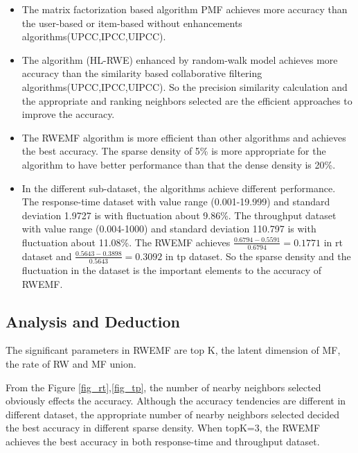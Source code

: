 \documentclass[conference]{IEEEtran}
\begin{document}
\begin{itemize}
\item The matrix factorization based algorithm PMF achieves more accuracy than the user-based or item-based without enhancements algorithms(UPCC,IPCC,UIPCC). 
\item The algorithm (HL-RWE) enhanced by random-walk model achieves more accuracy than the similarity based collaborative filtering algorithms(UPCC,IPCC,UIPCC). So the precision similarity calculation and the appropriate and ranking neighbors selected are the efficient approaches to improve the accuracy.
\item The RWEMF algorithm is more efficient than other algorithms and achieves the best accuracy. The sparse density of 5\% is more appropriate for the algorithm to have better performance than that the dense density is 20\%.
\item In the different sub-dataset, the algorithms achieve different performance. The response-time dataset with value range (0.001-19.999) and standard deviation 1.9727 is with fluctuation about 9.86\%. The throughput dataset with value range (0.004-1000) and standard deviation 110.797 is with fluctuation about 11.08\%. The RWEMF achieves $\frac{0.6794-0.5591}{0.6794}=0.1771$ in rt dataset and $\frac{0.5643-0.3898}{0.5643}=0.3092$ in tp dataset. So the sparse density and the fluctuation in the dataset is the important elements to the accuracy of RWEMF.
\end{itemize}

\subsection{Analysis and Deduction}
\par The significant parameters in RWEMF are top K, the latent dimension of MF, the rate of RW and MF union. 

\par From the Figure \ref{fig_rt},\ref{fig_tp}, the number of nearby neighbors selected obviously effects the accuracy. Although the accuracy tendencies are different in different dataset, the appropriate number of nearby neighbors selected decided the best accuracy in different sparse density. When topK=3, the RWEMF achieves the best accuracy in both response-time and throughput dataset. 
\end{document}
